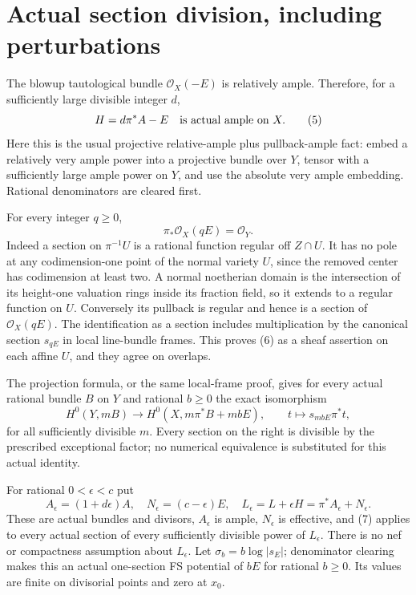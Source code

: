 \documentclass[11pt]{article}
\begin{document}
\section{Actual section division, including perturbations}
The blowup tautological bundle $\mathcal O_X(-E)$ is relatively
ample. Therefore, for a sufficiently large divisible integer $d$,
\[
 H=d\pi^*A-E\quad\hbox{is actual ample on }X.              \tag{5}
\]
Here this is the usual projective relative-ample plus pullback-ample
fact: embed a relatively very ample power into a projective bundle
over $Y$, tensor with a sufficiently large ample power on $Y$,
and use the absolute very ample embedding. Rational denominators
are cleared first.

For every integer $q\geq0$,
\[
                    \pi_*\mathcal O_X(qE)=\mathcal O_Y.  \tag{6}
\]
Indeed a section on $\pi^{-1}U$ is a rational function regular
off $Z\cap U$. It has no pole at any codimension-one point of
the normal variety $U$, since the removed center has codimension
at least two. A normal noetherian domain is the intersection of
its height-one valuation rings inside its fraction field, so it
extends to a regular function on $U$. Conversely its pullback is
regular and hence is a section of $\mathcal O_X(qE)$.
The identification as a section includes multiplication by the
canonical section $s_{qE}$ in local line-bundle frames. This proves
(6) as a sheaf assertion on each affine $U$, and they agree on
overlaps.

The projection formula, or the same local-frame proof, gives for
every actual rational bundle $B$ on $Y$ and rational $b\geq0$
the exact isomorphism
\[
 H^0(Y,mB)\longrightarrow H^0(X,m\pi^*B+mbE),\qquad
                  t\longmapsto s_{mbE}\pi^*t,             \tag{7}
\]
for all sufficiently divisible $m$. Every section on the right is
divisible by the prescribed exceptional factor; no numerical
equivalence is substituted for this actual identity.

For rational $0<\epsilon<c$ put
\[
 A_\epsilon=(1+d\epsilon)A,\quad
 N_\epsilon=(c-\epsilon)E,\quad
 L_\epsilon=L+\epsilon H=\pi^*A_\epsilon+N_\epsilon.
                                                               \tag{8}
\]
These are actual bundles and divisors, $A_\epsilon$ is ample,
$N_\epsilon$ is effective, and (7) applies to every actual section
of every sufficiently divisible power of $L_\epsilon$.
There is no nef or compactness assumption about $L_\epsilon$.
Let $\sigma_b=b\log|s_E|$; denominator clearing makes this an
actual one-section FS potential of $bE$ for rational $b\geq0$.
Its values are finite on divisorial points and zero at $x_0$.
\end{document}
